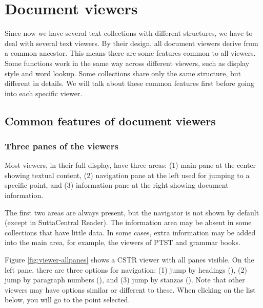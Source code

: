 \chapter{Document viewers}\label{chap:viewer}

Since now we have several text collections with different structures, we have to deal with several text viewers. By their design, all document viewers derive from a common ancestor. This means there are some features common to all viewers. Some functions work in the same way across different viewers, such as display style and word lookup. Some collections share only the same structure, but different in details. We will talk about these common features first before going into each specific viewer.

\section{Common features of document viewers}

\subsection{Three panes of the viewers}

Most viewers, in their full display, have three areas: (1) main pane at the center showing textual content, (2) navigation pane at the left used for jumping to a specific point, and (3) information pane at the right showing document information.

The first two areas are always present, but the navigator is not shown by default (except in SuttaCentral Reader). The information area may be absent in some collections that have little data. In some cases, extra information may be added into the main area, for example, the viewers of PTST and grammar books.


Figure \ref{fig:viewer-allpanes} shows a CSTR viewer with all panes visible. On the left pane, there are three options for navigation: (1) jump by headings ({\faSix {}}), (2) jump by paragraph numbers ({\faSix {}}), and (3) jump by stanzas ({\faSix {}}). Note that other viewers may have options similar or different to these. When clicking on the list below, you will go to the point selected.

